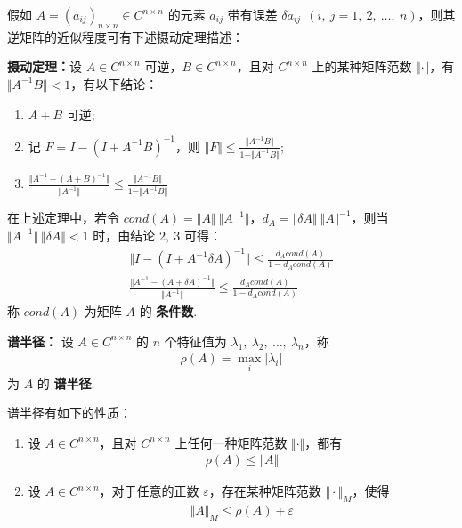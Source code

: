             \par 假如 $A = (a_{ij})_{n \times n} \in C^{n \times n}$ 的元素 $a_{ij}$ 带有误差 $\delta a_{ij} \ \ (i, \ j = 1, \ 2, \ \dots, \ n)$，则其逆矩阵的近似程度可有下述摄动定理描述：
            \par \textbf{摄动定理：}设 $A \in C^{n \times n}$ 可逆，$B \in C^{n \times n}$，且对 $C^{n \times n}$ 上的某种矩阵范数 $\Vert \cdot \Vert$，有 $\Vert A^{-1}B \Vert < 1$，有以下结论：
            \begin{enumerate}
                \item $A + B$ 可逆;
                \item 记 $F = I - (I + A^{-1}B)^{-1}$，则 $\Vert F \Vert \leq \frac{\Vert A^{-1}B \Vert}{1 - \Vert A^{-1}B \Vert}$;
                \item $\frac{\Vert A^{-1} - (A + B)^{-1} \Vert}{\Vert A^{-1} \Vert} \leq \frac{\Vert A^{-1}B \Vert}{1 - \Vert A^{-1}B \Vert}$
            \end{enumerate}
            \par 在上述定理中，若令 $cond(A) = \Vert A \Vert \ \Vert A^{-1} \Vert$，$d_A = \Vert \delta A \Vert \ \Vert A\Vert^{-1}$，则当 $\Vert A^{-1} \Vert \ \Vert \delta A \Vert < 1$ 时，由结论 $2, \ 3$ 可得：
            \begin{align*}
                \Vert I - (I + A^{-1} \delta A)^{-1} \Vert \leq \frac{d_Acond(A)}{1 - d_Acond(A)} \\ \frac{\Vert A^{-1} - (A + \delta A)^{-1} \Vert}{\Vert A^{-1} \Vert} \leq \frac{d_Acond(A)}{1 - d_Acond(A)}
            \end{align*}
            称 $cond(A)$ 为矩阵 $A$ 的 \textbf{条件数}.
            \\
            \par \textbf{谱半径：} 设 $A \in C^{n \times n}$ 的 $n$ 个特征值为 $\lambda_1, \ \lambda_2, \ \dots, \ \lambda_n$，称 
            \begin{align*}
                \rho(A) = \underset{i}\max|\lambda_i|
            \end{align*}
            为 $A$ 的 \textbf{谱半径}.
            \par 谱半径有如下的性质：
            \begin{enumerate}
                \item 设 $A \in C^{n \times n}$，且对 $C^{n \times n}$ 上任何一种矩阵范数 $\Vert \cdot \Vert$，都有 
                    \begin{align*}
                        \rho(A) \leq \Vert A \Vert
                    \end{align*}
                \item 设 $A \in C^{n \times n}$，对于任意的正数 $\varepsilon$，存在某种矩阵范数 $\Vert \cdot \Vert_M$，使得
                    \begin{align*}
                        \Vert A \Vert_M \leq \rho(A) + \varepsilon
                    \end{align*}
            \end{enumerate}

